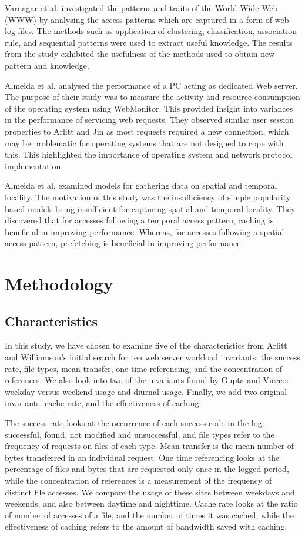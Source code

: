 \documentclass[10pt,conference]{IEEEtran}
\begin{document}
Varnagar et al. \cite{Varnagar} investigated the patterns and traits of the World Wide Web (WWW) by analysing the access patterns which are captured in a form of web log files. The methods such as application of clustering, classification, association rule, and sequential patterns were used to extract useful knowledge. The results from the study exhibited the usefulness of the methods used to obtain new pattern and knowledge.

Almeida et al. \cite{almeida} analysed the performance of a PC acting as dedicated Web server. The purpose of their study was to measure the activity and resource consumption of the operating system using WebMonitor. This provided insight into variances in the performance of servicing web requests. They observed similar user session properties to Arlitt and Jin \cite{world_cup} as most requests required a new connection, which may be problematic for operating systems that are not designed to cope with this. This highlighted the importance of operating system and network protocol implementation.

Almeida et al. \cite{reference_locality} examined models for gathering data on spatial and temporal locality. The motivation of this study was the insufficiency of simple popularity based models being insufficient for capturing spatial and temporal locality. They discovered that for accesses following a temporal access pattern, caching is beneficial in improving performance. Whereas, for accesses following a spatial access pattern, prefetching is beneficial in improving performance.

\section{Methodology}\label{methodology}
\subsection{Characteristics}\label{lab:characteristics}
In this study, we have chosen to examine five of the characteristics from Arlitt and Williamson's initial search\cite{needed} for ten web server workload invariants: the success rate, file types, mean transfer, one time referencing, and the concentration of references. We also look into two of the invariants found by Gupta and Viecco\cite{needed}: weekday versus weekend usage and diurnal usage. Finally, we add two original invariants: cache rate, and the effectiveness of caching.

The success rate looks at the occurrence of each success code in the log: successful, found, not modified and unsuccessful, and file types refer to the frequency of requests on files of each type. Mean transfer is the mean number of bytes transferred in an individual request. One time referencing looks at the percentage of files and bytes that are requested only once in the logged period, while the concentration of references is a measurement of the frequency of distinct file accesses. We compare the usage of these sites between weekdays and weekends, and also between daytime and nighttime. Cache rate looks at the ratio of number of accesses of a file, and the number of times it was cached, while the effectiveness of caching refers to the amount of bandwidth saved with caching.
\end{document}
